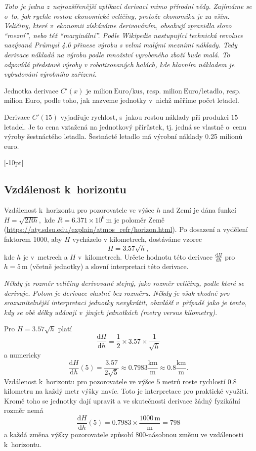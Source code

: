 \textit{Toto je jedna z nejrozšířenější aplikací derivací mimo přírodní vědy. Zajímáme se o to, jak rychle rostou ekonomické veličiny, protože ekonomika je za vším. Veličiny, které v ekonomii získáváme derivováním, obsahují zpravidla slovo ``mezní'', nebo též ``marginální''. Podle Wikipedie nastupující technická revoluce nazývaná Průmysl 4.0 přinese výrobu s velmi malými mezními náklady. Tedy derivace nákladů na výrobu podle množství vyrobeného zboží bude malá. To odpovídá představě výroby v robotizovaných halách, kde hlavním nákladem je vybudování výrobního zařízení.}

\reseni
Jednotka derivace $C'(x)$ je $\mathrm{milion\ Euro}/\mathrm{kus}$, resp. 
$\mathrm{milion\ Euro}/\mathrm{letadlo}$, resp. milion Euro, podle toho, jak nazveme jednotky v nichž měříme počet letadel.

Derivace $C'(15)$ vyjadřuje rychlost, s jakou rostou náklady při produkci $15$ letadel. Je to cena vztažená na jednotkový přírůstek, tj. jedná se vlastně o cenu výroby šestnáctého letadla. Šestnácté letadlo má výrobní náklady 0.25 milionů euro. 

\konec



[-10pt]
\subsection{Vzdálenost k horizontu}
Vzdálenost k horizontu pro pozorovatele ve výšce $h$ nad Zemí je dána funkcí $H=\sqrt {2Rh},$ kde $R=6.371\times 10^6\,\mathrm m$ je poloměr Země (\url{https://aty.sdsu.edu/explain/atmos_refr/horizon.html}). Po dosazení a vydělení faktorem 1000, aby $H$ vycházelo v kilometrech, dostáváme vzorec $$H=3.57\sqrt{h},$$ kde $h$ je v metrech a $H$ v kilometrech. Určete hodnotu této derivace $\frac{\mathrm d H}{\mathrm dh}$ pro $h=5\,\mathrm{m}$ (včetně jednotky) a slovní interpretaci této derivace.

\textit{Někdy je rozměr veličiny derivované stejný, jako rozměr veličiny, podle které se derivuje. Potom je derivace vlastně bez rozměru. Někdy je však vhodné pro srozumitelnější interpretaci jednotky nevykrátit, obzvlášť v případě jako je tento, kdy se obě délky udávají v jiných jednotkách (metry versus kilometry). }

\reseni
Pro $H=3.57\sqrt h$ platí $$\frac{\mathrm dH}{\mathrm dh}=\frac 12 \times 3.57 \times \frac {1}{\sqrt h}$$ a numericky
$$\frac{\mathrm dH}{\mathrm dh}(5)=\frac{3.57}{2\sqrt 5}\approx 0.7983 \frac {\mathrm{km}}{\mathrm m}\approx 0.8 \frac {\mathrm{km}}{\mathrm m}.$$ Vzdálenost k horizontu pro pozorovatele ve výšce $5$ metrů roste rychlostí 0.8 kilometru na každý metr výšky navíc. Toto je interpretace pro praktické využití. Kromě toho se jednotky dají upravit a ve skutečnosti derivace žádný fyzikální rozměr nemá
$$\frac{\mathrm dH}{\mathrm dh}(5) =0.7983 \times \frac {1000\, \mathrm{m}}{\mathrm m}=798$$ a každá změna výšky pozorovatele způsobí 800-násobnou změnu ve vzdálenosti k horizontu.
\konec




